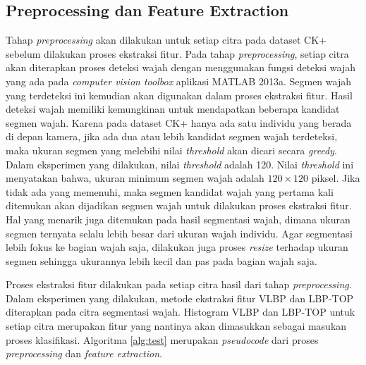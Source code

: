 \documentclass[review,3p,12pt,times]{elsarticle}
\begin{document}

\subsection{Preprocessing dan Feature Extraction}
\label{preprocessing-featextract}

Tahap \textit{preprocessing} akan dilakukan untuk setiap citra pada dataset CK+ sebelum dilakukan proses ekstraksi fitur. Pada tahap \textit{preprocessing}, setiap citra akan diterapkan proses deteksi wajah dengan menggunakan fungsi deteksi wajah yang ada pada \textit{computer vision toolbox} aplikasi MATLAB 2013a. Segmen wajah yang terdeteksi ini kemudian akan digunakan dalam proses ekstraksi fitur. Hasil deteksi wajah memiliki kemungkinan untuk mendapatkan beberapa kandidat segmen wajah. Karena pada dataset CK+ hanya ada satu individu yang berada di depan kamera, jika ada dua atau lebih kandidat segmen wajah terdeteksi, maka ukuran segmen yang melebihi nilai \textit{threshold} akan dicari secara \textit{greedy}. Dalam eksperimen yang dilakukan, nilai \textit{threshold} adalah 120. Nilai \textit{threshold} ini menyatakan bahwa, ukuran minimum segmen wajah adalah $120 \times 120$ piksel. Jika tidak ada yang memenuhi, maka segmen kandidat wajah yang pertama kali ditemukan akan dijadikan segmen wajah untuk dilakukan proses ekstraksi fitur. Hal yang menarik juga ditemukan pada hasil segmentasi wajah, dimana ukuran segmen ternyata selalu lebih besar dari ukuran wajah individu. Agar segmentasi lebih fokus ke bagian wajah saja, dilakukan juga proses \textit{resize} terhadap ukuran segmen sehingga ukurannya lebih kecil dan pas pada bagian wajah saja. 

Proses ekstraksi fitur dilakukan pada setiap citra hasil dari tahap \textit{preprocessing}. Dalam eksperimen yang dilakukan, metode ekstraksi fitur VLBP dan LBP-TOP diterapkan pada citra segmentasi wajah. Histogram VLBP dan LBP-TOP untuk setiap citra merupakan fitur yang nantinya akan dimasukkan sebagai masukan proses klasifikasi. Algoritma \ref{alg:test} merupakan \textit{pseudocode} dari proses \textit{preprocessing} dan \textit{feature extraction}. 
\end{document}
